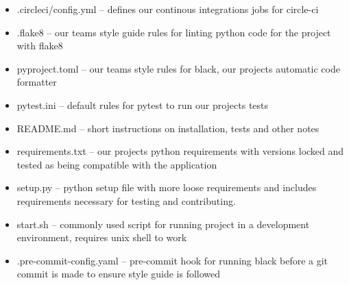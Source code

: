 \documentclass[main.tex]{subfiles}
\begin{document}
\begin{itemize}

\item
  .circleci/config.yml -- defines our continous integrations jobs for
  circle-ci
\item
  .flake8 -- our teams style guide rules for linting python code for the
  project with flake8
\item
  pyproject.toml -- our teams style rules for black, our projects
  automatic code formatter
\item
  pytest.ini -- default rules for pytest to run our projects tests
\item
  README.md -- short instructions on installation, tests and other notes
\item
  requirements.txt -- our projects python requirements with versions
  locked and tested as being compatible with the application
\item
  setup.py -- python setup file with more loose requirements and
  includes requirements necessary for testing and contributing.
\item
  start.sh -- commonly used script for running project in a development
  environment, requires unix shell to work
\item
  .pre-commit-config.yaml -- pre-commit hook for running black before a
  git commit is made to ensure style guide is followed
\end{itemize}
\end{document}
